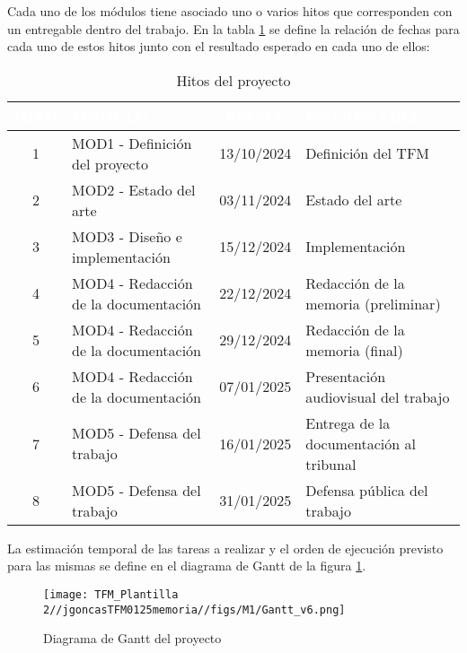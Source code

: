 \documentclass[12pt,a4paper,twoside]{book}
\begin{document}
Cada uno de los módulos tiene asociado uno o varios hitos que corresponden con un entregable dentro del trabajo. En la tabla \ref{tab:tab_hitos} se define la relación de fechas para cada uno de estos hitos junto con el resultado esperado en cada uno de ellos:

\begin{table}[H]
    \centering
    \begin{tabular}{cm{18em}cm{10em}}
       \hline
       \rowcolor[HTML]{004AAD}
       \textcolor{white}{\textbf{HITO}} & \textcolor{white}{\textbf{MÓDULO}} & \textcolor{white}{\textbf{FECHA}} & \textcolor{white}{\textbf{ENTREGABLE}} \\
       \hline
         1 & MOD1 - Definición del proyecto & 13/10/2024 & Definición del TFM \\
       \hline
         2 & MOD2 - Estado del arte & 03/11/2024 & Estado del arte \\
       \hline
         3 & MOD3 - Diseño e implementación & 15/12/2024 & Implementación \\
       \hline
         4 & MOD4 - Redacción de la documentación & 22/12/2024 & Redacción de la memoria (preliminar)\\
       \hline
         5 & MOD4 - Redacción de la documentación & 29/12/2024 & Redacción de la memoria (final) \\
       \hline
         6 & MOD4 - Redacción de la documentación & 07/01/2025 & Presentación audiovisual del trabajo \\
       \hline
         7 & MOD5 - Defensa del trabajo & 16/01/2025 & Entrega de la documentación al tribunal \\
       \hline
         8 & MOD5 - Defensa del trabajo & 31/01/2025 & Defensa pública del trabajo \\
       \hline
    \end{tabular}
    \caption{Hitos del proyecto}
    \label{tab:tab_hitos}
\end{table}

La estimación temporal de las tareas a realizar y el orden de ejecución previsto para las mismas se define en el diagrama de Gantt de la figura \ref{fig:fig_gantt}.

\begin{figure}[H]
    \centering
    \texttt{[image: TFM\_Plantilla 2//jgoncasTFM0125memoria//figs/M1/Gantt\_v6.png]}
    \caption{Diagrama de Gantt del proyecto}
    \label{fig:fig_gantt}
\end{figure}
\end{document}
